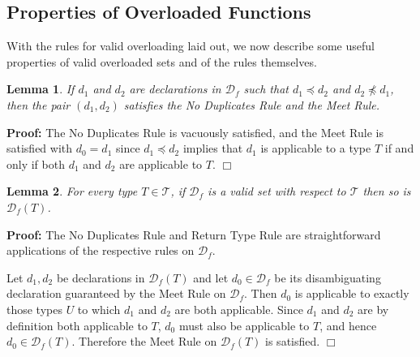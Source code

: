 \documentclass[10pt]{sigplanconf}
\newcommand{\ms}{\preceq}
\newcommand{\T}{\ensuremath{\mathcal{T}}}
\newcommand{\D}{\ensuremath{\mathcal{D}}}
\newcommand{\Df}[1][f]{\D_{\!#1}}
\newtheorem{lemma}{Lemma}
\newenvironment{proof}{\noindent \textbf{Proof:} }{\hfill $\Box$}
\begin{document}
\subsection{Properties of Overloaded Functions}
With the rules for valid overloading laid out, we now describe some useful
properties of valid overloaded sets and of the rules themselves.

\begin{lemma}
\label{lem:strictms}
If $d_1$ and $d_2$ are declarations in $\Df$ such that
$d_1 \ms d_2$ and $d_2 \not\ms d_1$, then the pair $(d_1, d_2)$ satisfies the
No Duplicates Rule and the Meet Rule.
\end{lemma}
\begin{proof}
The No Duplicates Rule is vacuously satisfied, and the Meet Rule is satisfied
with $d_0 = d_1$ since $d_1 \ms d_2$ implies that $d_1$ is applicable to a type $T$ if and only if both $d_1$ and $d_2$ are applicable to $T$.
\end{proof}

\begin{lemma}
\label{lem:subsetvalid}
For every type $T \in \T$, if $\Df$ is a valid set with respect to $\T$ then
so is $\Df(T)$.
\end{lemma}
\begin{proof}
The No Duplicates Rule and Return Type Rule are straightforward applications
of the respective rules on $\Df$.

Let $d_1, d_2$ be declarations in $\Df(T)$ and let $d_0 \in \Df$ be its
disambiguating declaration guaranteed by the Meet Rule on $\Df$. Then $d_0$ is applicable to exactly those types $U$ to which $d_1$ and $d_2$ are
both applicable. Since $d_1$ and $d_2$ are by definition both applicable
to $T$, $d_0$ must also be applicable to $T$, and hence $d_0 \in \Df(T)$.
Therefore the Meet Rule on $\Df(T)$ is satisfied.
\end{proof}
\end{document}
